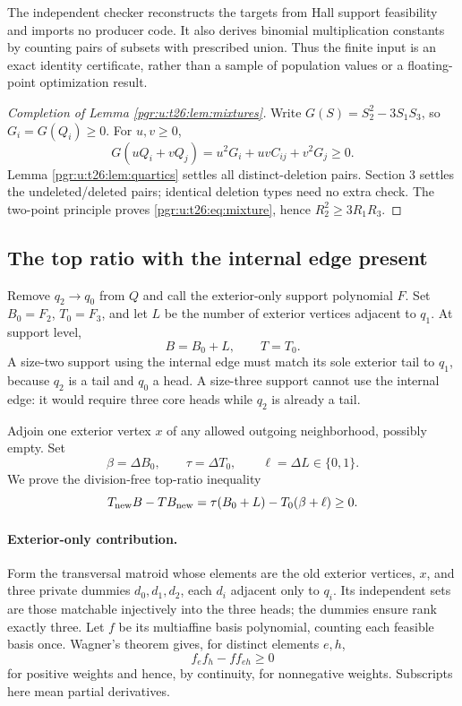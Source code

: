 \documentclass[11pt]{article}
\numberwithin{equation}{section}
\theoremstyle{definition}\newtheorem{definition}[theorem]{Definition}\newtheorem{remark}[theorem]{Remark}
\begin{document}
The independent checker reconstructs the targets from Hall support feasibility and imports no producer code. It also derives binomial multiplication constants by counting pairs of subsets with prescribed union. Thus the finite input is an exact identity certificate, rather than a sample of population values or a floating-point optimization result.

\begin{proof}[Completion of Lemma \ref{pgr:u:t26:lem:mixtures}]
Write $G(S)=S_2^2-3S_1S_3$, so $G_i=G(Q_i)\ge0$. For $u,v\ge0$,
\[
G(uQ_i+vQ_j)=u^2G_i+uvC_{ij}+v^2G_j\ge0.
\]
Lemma \ref{pgr:u:t26:lem:quartics} settles all distinct-deletion pairs. Section 3 settles the undeleted/deleted pairs; identical deletion types need no extra check. The two-point principle proves \eqref{pgr:u:t26:eq:mixture}, hence $R_2^2\ge3R_1R_3$.
\end{proof}

\subsection{The top ratio with the internal edge present}
Remove $q_2\to q_0$ from $Q$ and call the exterior-only support polynomial $F$. Set $B_0=F_2$, $T_0=F_3$, and let $L$ be the number of exterior vertices adjacent to $q_1$. At support level,
\begin{equation}\label{pgr:u:t26:eq:internal}
B=B_0+L,\qquad T=T_0.
\end{equation}
A size-two support using the internal edge must match its sole exterior tail to $q_1$, because $q_2$ is a tail and $q_0$ a head. A size-three support cannot use the internal edge: it would require three core heads while $q_2$ is already a tail.

Adjoin one exterior vertex $x$ of any allowed outgoing neighborhood, possibly empty. Set
\[
\beta=\Delta B_0,\qquad \tau=\Delta T_0,\qquad \ell=\Delta L\in\{0,1\}.
\]
We prove the division-free top-ratio inequality
\begin{equation}\label{pgr:u:t26:eq:ratio}
T_{\rm new}B-TB_{\rm new}
=\tau(B_0+L)-T_0(\beta+\ell)\ge0.
\end{equation}

\paragraph{Exterior-only contribution.}
Form the transversal matroid whose elements are the old exterior vertices, $x$, and three private dummies $d_0,d_1,d_2$, each $d_i$ adjacent only to $q_i$. Its independent sets are those matchable injectively into the three heads; the dummies ensure rank exactly three. Let $f$ be its multiaffine basis polynomial, counting each feasible basis once. Wagner's theorem \cite{WagnerR3} gives, for distinct elements $e,h$,
\[
f_e f_h-f f_{eh}\ge0
\]
for positive weights and hence, by continuity, for nonnegative weights. Subscripts here mean partial derivatives.
\end{document}
